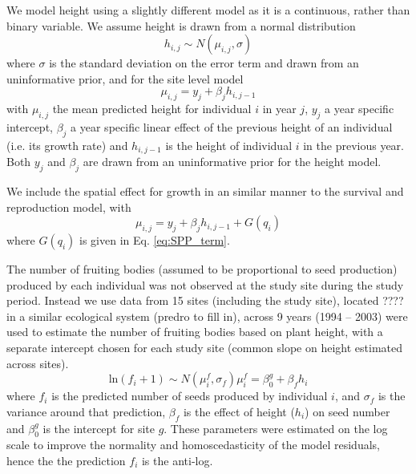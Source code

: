 \documentclass[12pt,a4paper]{article}
\begin{document}
We model height using a slightly different model as it is a continuous, rather than binary variable. We assume height is drawn from a normal distribution 
\begin{equation}\label{eq:height}
	h_{i, j} \sim N(\mu_{i,j}, \sigma)
\end{equation}
where $\sigma$ is the standard deviation on the error term and drawn from an uninformative prior, and for the site level model 
\begin{equation}
	\mu_{i, j} = y_j + \beta_j h_{i, j-1}
\end{equation}
with $\mu_{i, j}$ the mean predicted height for individual $i$ in year $j$, $y_j$ a year specific intercept, $\beta_j$ a year specific linear effect of the previous height of an individual (i.e. its growth rate) and $h_{i, j-1}$ is the height of individual $i$ in the previous year. Both $y_j$ and $\beta_j$ are drawn from an uninformative prior for the height model.  

We include the spatial effect for growth in an similar manner to the survival and reproduction model, with 
\begin{equation}
	\mu_{i,j} = y_j + \beta_j h_{i, j-1} + G(q_i)
\end{equation}     
where $G(q_i)$ is given in Eq. \ref{eq:SPP_term}. 

The number of fruiting bodies (assumed to be proportional to seed production)  produced by each individual was not observed at the study site  during the study period. Instead we use data from 15 sites (including the study site), located ???? in a similar ecological system (predro to fill in), across 9 years (1994 -- 2003) were used to estimate the number of fruiting bodies based on plant height, with a separate intercept chosen for each study site (common slope on height estimated across sites).  
\begin{subequations} 
\label{eq:seed_pro}
\begin{equation}
	\text{ln}(f_i + 1) \sim N(\mu_i^f, \sigma_f)
\end{equation}
\begin{equation}
	\mu_i^f = \beta_0^g + \beta_f h_i
\end{equation}
\end{subequations}
where $f_i$ is the predicted number of seeds produced by individual $i$, and $\sigma_f$ is the variance around that prediction, $\beta_f$ is the effect of height ($h_i$) on seed number and $\beta_0^g$ is the intercept for site $g$. These parameters were estimated on the log scale to improve the normality and homoscedasticity of the model residuals, hence the the prediction $f_i$ is the anti-log.       
\end{document}
